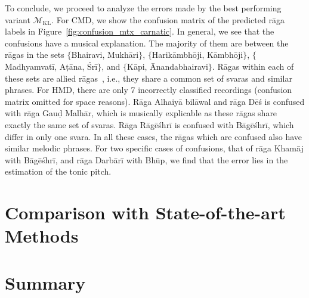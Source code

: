 

To conclude, we proceed to analyze the errors made by the best performing variant $\mathcal{M}_{\mathrm{KL}}$. For  CMD, we show the confusion matrix of the predicted r\={a}ga labels in Figure~\ref{fig:confusion_mtx_carnatic}. In general, we see that the confusions have a musical explanation. The majority of them are between the r\={a}gas in the sets $\lbrace$Bhairavi, Mukh\={a}ri$\rbrace$, $\lbrace$Harik\={a}mbh\={o}ji, K\={a}mbh\={o}ji$\rbrace$, $\lbrace$Madhyamvat\={i}, A\d{t}\={a}na, \'Sr\={i}$\rbrace$, and $\lbrace$K\={a}pi, \={A}nandabhairavi$\rbrace$. R\={a}gas within each of these sets are allied r\={a}gas~\cite{Viswanathan2004}, i.e., they share a common set of svaras and similar phrases. For HMD, there are only 7 incorrectly classified recordings (confusion matrix omitted for space reasons). R\={a}ga Alhaiy\={a} bil\={a}wal and r\={a}ga D\={e}\'{s} is confused with r\={a}ga Gau\d{d} Malh\={a}r, which is musically explicable as these r\={a}gas share exactly the same set of svaras. R\={a}ga R\={a}g\={e}\'{s}hr\={i} is confused with B\={a}g\={e}\'{s}hr\={i}, which differ in only one svara. In all these cases, the r\={a}gas which are confused also have similar melodic phrases. For two specific cases of confusions, that of r\={a}ga  Kham\={a}j with B\={a}g\={e}\'{s}hr\={i}, and r\={a}ga Darb\={a}r\={i} with Bh\={u}p, we find that the error lies in the estimation of the tonic pitch.


\section{Comparison with State-of-the-art Methods}
\label{sec:summary_raga_recognition}

\section{Summary}
\label{sec:summary_raga_recognition}




